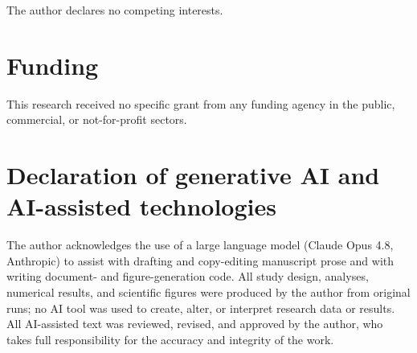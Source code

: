 \documentclass[11pt]{article}
\begin{document}
The author declares no competing interests.

\section*{Funding}

This research received no specific grant from any funding agency in the public,
commercial, or not-for-profit sectors.

\section*{Declaration of generative AI and AI-assisted technologies}

The author acknowledges the use of a large language model (Claude Opus 4.8, Anthropic) to
assist with drafting and copy-editing manuscript prose and with writing
document- and figure-generation code. All study design, analyses, numerical results, and
scientific figures were produced by the author from original runs; no AI tool was used to
create, alter, or interpret research data or results. All AI-assisted text was reviewed,
revised, and approved by the author, who takes full responsibility for the accuracy and
integrity of the work.

\end{document}
